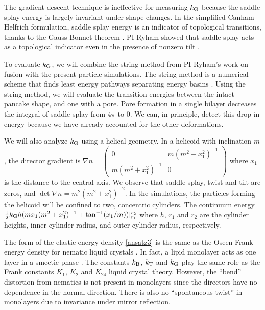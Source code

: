 The gradient descent technique is ineffective for measuring $k_{\mathrm{G}}$ because
the saddle splay energy is largely invariant under shape changes.
In the simplified Canham-Helfrich formulation, saddle splay energy is an indicator of topological transitions, thanks to the  Gauss-Bonnet theorem
\cite{TerziDeserno17}.
PI-Ryham showed that saddle splay acts as a topological indicator even in the presence of nonzero tilt \cite{RyKlYaCo16}. 

To evaluate $k_{\mathrm{G}}$, we will combine the string method from PI-Ryham's work on fusion \cite{RyKlYaCo16} with
the present particle simulations. The string method is a numerical scheme that finds
least energy pathways separating energy basins \cite{doi:10.1063/1.2720838}.
Using the string method, we will evaluate the transition energies between the intact pancake shape,
and one with a pore. Pore formation in a single bilayer decreases the integral of saddle splay from $4\pi$
to $0$. We can, in principle, detect this drop in energy because we have already accounted for the other deformations. 

We will also analyze $k_{\mathrm{G}}$ using a helical geometry. In a helicoid with inclination $m$, the director
gradient is $\nabla n = \begin{pmatrix} 0 & m(m^2+x_1^2)^{-1} \\ m(m^2+x_1^2)^{-1} & 0\end{pmatrix}$ where $x_1$ is the distance to the central
axis. We observe that saddle splay, twist and tilt are zeros, and $\det \nabla n = m^2(m^2+x_1^2)^{-2}$.
In the simulations, the particles forming the helicoid will be confined to two, concentric cylinders. The
continuum energy $\tfrac{1}{2}k_{\mathrm{G}} h(m x_1(m^2+x_1^2)^{-1} + \tan^{-1}(x_1/m)) |_{r_1}^{r_2}$ where $h$, $r_1$ and $r_2$
are the cylinder heights, inner cylinder radius, and outer cylinder radius, respectively. 

The form of the elastic energy density \eqref{ansatz3} is the same as
the Oseen-Frank energy density for nematic liquid crystals \cite{ANDRIENKO2018520,Tran7106,Helfrich73}.   In fact,  
a lipid monolayer acts as one layer in a smectic  phase \cite{REYESMATEO1995978,Rangamani20140463,PhysRevLett.113.248102}. 
The constants $k_{\mathrm{B}}$, $k_{\mathrm{T}}$  and $k_{\mathrm{G}}$ play the same role as the Frank constants $K_1$, $K_2$ and $K_{24}$
liquid crystal theory. However, the ``bend'' distortion from nematics  
is not present in monolayers since the directors have no dependence in the normal direction.
There is also no ``spontaneous twist'' in monolayers due to invariance under mirror reflection. 


